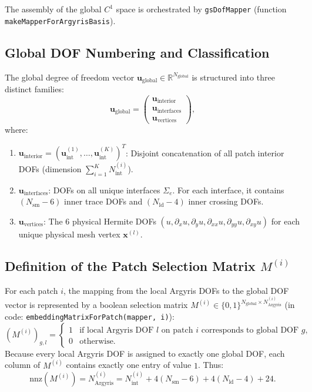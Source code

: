 \documentclass[11pt,a4paper]{article}
\newcommand{\R}{\mathbb{R}}
\begin{document}
The assembly of the global $C^1$ space is orchestrated by \texttt{gsDofMapper} (function \texttt{makeMapperForArgyrisBasis}).

\subsection{Global DOF Numbering and Classification}
The global degree of freedom vector $\mathbf{u}_{\text{global}} \in \R^{N_{\text{global}}}$ is structured into three distinct families:
\begin{equation}
    \mathbf{u}_{\text{global}} = \begin{pmatrix}
        \mathbf{u}_{\text{interior}} \\
        \mathbf{u}_{\text{interfaces}} \\
        \mathbf{u}_{\text{vertices}}
    \end{pmatrix},
\end{equation}
where:
\begin{enumerate}
    \item $\mathbf{u}_{\text{interior}} = (\mathbf{u}_{\text{int}}^{(1)}, \dots, \mathbf{u}_{\text{int}}^{(K)})^T$: Disjoint concatenation of all patch interior DOFs (dimension $\sum_{i=1}^K N_{\text{int}}^{(i)}$).
    \item $\mathbf{u}_{\text{interfaces}}$: DOFs on all unique interfaces $\Sigma_e$. For each interface, it contains $(N_{\text{sm}} - 6)$ inner trace DOFs and $(N_{\text{ld}} - 4)$ inner crossing DOFs.
    \item $\mathbf{u}_{\text{vertices}}$: The 6 physical Hermite DOFs $(u, \partial_x u, \partial_y u, \partial_{xx} u, \partial_{yy} u, \partial_{xy} u)$ for each unique physical mesh vertex $\mathbf{x}^{(l)}$.
\end{enumerate}

\subsection{Definition of the Patch Selection Matrix \texorpdfstring{$M^{(i)}$}{M(i)}}
For each patch $i$, the mapping from the local Argyris DOFs to the global DOF vector is represented by a boolean selection matrix $M^{(i)} \in \{0, 1\}^{N_{\text{global}} \times N_{\text{Argyris}}^{(i)}}$ (in code: \texttt{embeddingMatrixForPatch(mapper, i)}):
\begin{equation}
    (M^{(i)})_{g, l} = \begin{cases}
        1 & \text{if local Argyris DOF } l \text{ on patch } i \text{ corresponds to global DOF } g, \\
        0 & \text{otherwise.}
    \end{cases}
\end{equation}
Because every local Argyris DOF is assigned to exactly one global DOF, each column of $M^{(i)}$ contains exactly one entry of value $1$. Thus:
\begin{equation}
    \text{nnz}(M^{(i)}) = N_{\text{Argyris}}^{(i)} = N_{\text{int}}^{(i)} + 4(N_{\text{sm}} - 6) + 4(N_{\text{ld}} - 4) + 24.
\end{equation}
\end{document}
